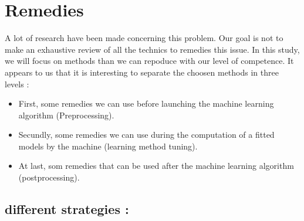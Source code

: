 \documentclass[
]{report}
\providecommand{\tightlist}{%
  \setlength{\itemsep}{0pt}\setlength{\parskip}{0pt}}
\begin{document}
\hypertarget{remedies}{%
\chapter{Remedies}\label{remedies}}

A lot of research have been made concerning this problem. Our goal is not to make an exhaustive review of all the technics to remedies this issue.
In this study, we will focus on methods than we can repoduce with our level of competence. It appears to us that it is interesting to separate the choosen methods in three levels :

\begin{itemize}
\tightlist
\item
  First, some remedies we can use before launching the machine learning algorithm (Preprocessing).
\item
  Secundly, some remedies we can use during the computation of a fitted models by the machine (learning method tuning).
\item
  At last, som remedies that can be used after the machine learning algorithm (postprocessing).
\end{itemize}

\hypertarget{different-strategies}{%
\section{different strategies :}\label{different-strategies}}
\end{document}
